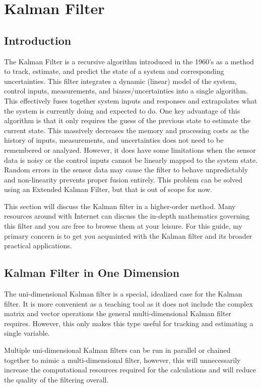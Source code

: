 \chapter{Kalman Filter} \label{chap:kalman_filter}
\section{Introduction} 
The Kalman Filter is a recursive algorithm introduced in the 1960's as a method to track, estimate, and predict the state of a system and corresponding uncertainties.
This filter integrates a dynamic (linear) model of the system, control inputs, measurements, and biases/uncertainties into a single algorithm.
This effectively fuses together system inputs and responses and extrapolates what the system is currently doing and expected to do.
One key advantage of this algorithm is that it only requires the guess of the previous state to estimate the current state. 
This massively decreases the memory and processing costs as the history of inputs, measurements, and uncertainties does not need to be remembered or analyzed.
However, it does have some limitations when the sensor data is noisy or the control inputs cannot be linearly mapped to the system state.
Random errors in the sensor data may cause the filter to behave unpredictably and non-linearity prevents proper fusion entirely.
This problem can be solved using an Extended Kalman Filter, but that is out of scope for now.

This section will discuss the Kalman filter in a higher-order method.
Many resources around with Internet can discuss the in-depth mathematics governing this filter and you are free to browse them at your leisure. 
For this guide, my primary concern is to get you acquainted with the Kalman filter and its broader practical applications.

\section{Kalman Filter in One Dimension}
The uni-dimensional Kalman filter is a special, idealized case for the Kalman filter.
It is more convenient as a teaching tool as it does not include the complex matrix and vector operations the general multi-dimensional Kalman filter requires.
However, this only makes this type useful for tracking and estimating a single variable.

Multiple uni-dimensional Kalman filters can be run in parallel or chained together to mimic a multi-dimensional filter, however, this will unnecessarily increase the computational resources required for the calculations and will reduce the quality of the filtering overall.

